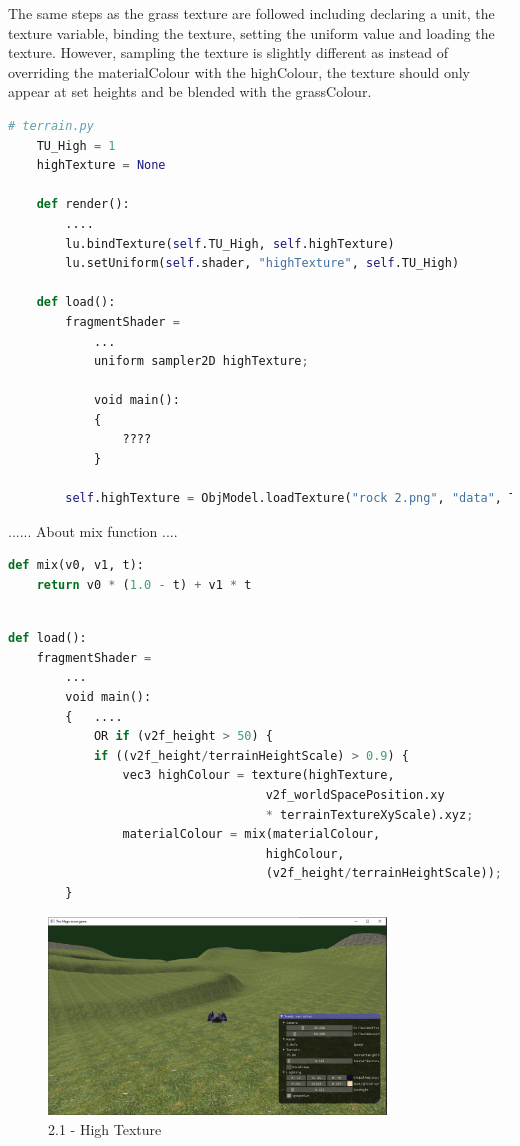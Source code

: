 \documentclass[a4 paper, 12pt]{article}
\begin{document}
The same steps as the grass texture are followed including declaring a unit, the texture variable, binding the texture, setting the uniform value and loading the texture. However, sampling the texture is slightly different as instead of overriding the materialColour with the highColour, the texture should only appear at set heights and be blended with the grassColour.

\begin{lstlisting}[language=python]
    # terrain.py
    TU_High = 1
    highTexture = None
    
    def render():
        ....
        lu.bindTexture(self.TU_High, self.highTexture)
        lu.setUniform(self.shader, "highTexture", self.TU_High)
    
    def load():
        fragmentShader = 
            ...
            uniform sampler2D highTexture;
    
            void main():
            {   
                ????
            }
        
        self.highTexture = ObjModel.loadTexture("rock 2.png", "data", True)        
        \end{lstlisting}




...... About mix function ....
\begin{lstlisting}[language=python]
def mix(v0, v1, t):
    return v0 * (1.0 - t) + v1 * t
\end{lstlisting}




    \begin{lstlisting}[language=python]

def load():
    fragmentShader = 
        ...   
        void main():
        {   ....
            OR if (v2f_height > 50) {
            if ((v2f_height/terrainHeightScale) > 0.9) {
                vec3 highColour = texture(highTexture, 
                                    v2f_worldSpacePosition.xy 
                                    * terrainTextureXyScale).xyz;
                materialColour = mix(materialColour, 
                                    highColour, 
                                    (v2f_height/terrainHeightScale));
        }       
    \end{lstlisting}


    \begin{figure} [H]
        \centering
        \includegraphics[width=0.8\textwidth, frame]
            {./images/mega_racer/2.1_a.PNG}
        \caption{2.1 - High Texture}   
    \end{figure}
\end{document}
